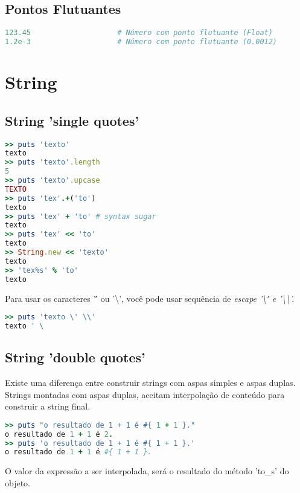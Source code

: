 \documentclass[serif,mathserif]{book}
\begin{document}
\subsection{Pontos Flutuantes}

\begin{lstlisting}[language=ruby]
123.45                    # Número com ponto flutuante (Float)
1.2e-3                    # Número com ponto flutuante (0.0012)
\end{lstlisting}

\section{String} 

\subsection{String 'single quotes'}

\begin{lstlisting}[language=ruby] 
>> puts 'texto'
texto
>> puts 'texto'.length
5
>> puts 'texto'.upcase
TEXTO
>> puts 'tex'.+('to')
texto
>> puts 'tex' + 'to' # syntax sugar
texto
>> puts 'tex' << 'to'
texto
>> String.new << 'texto'
texto
>> 'tex%s' % 'to'
texto
\end{lstlisting}

Para usar os caracteres '\'' ou '\textbackslash', você pode usar sequência de \em{escape}  '\textbackslash\'' e '\textbackslash\textbackslash'.

\begin{lstlisting}[language=ruby]
>> puts 'texto \' \\' 
texto ' \
\end{lstlisting}

\subsection{String 'double quotes'}

Existe uma diferença entre construir strings com aspas simples e aspas duplas. Strings montadas com aspas duplas, aceitam interpolação de conteúdo para construir a string final.

\begin{lstlisting}[language=ruby]
>> puts "o resultado de 1 + 1 é #{ 1 + 1 }."
o resultado de 1 + 1 é 2.
>> puts 'o resultado de 1 + 1 é #{ 1 + 1 }.'
o resultado de 1 + 1 é #{ 1 + 1 }.
\end{lstlisting}

O valor da expressão a ser interpolada, será o resultado do método 'to\_s' do objeto.
\end{document}

